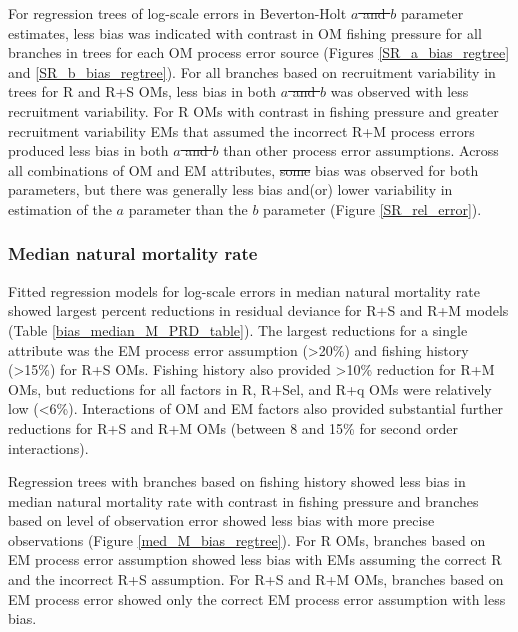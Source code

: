 \documentclass[
  12pt,
]{article}
\makeatletter
\providecommand{\DIFadd}[1]{{\protect\color{blue}\uwave{#1}}} %
\providecommand{\DIFdel}[1]{{\protect\color{red}\sout{#1}}} %
\providecommand{\DIFaddbegin}{} %
\providecommand{\DIFaddend}{} %
\providecommand{\DIFdelbegin}{} %
\providecommand{\DIFdelend}{} %
\providecommand{\DIFscaledelfig}{0.5}
\newlength{\DIFdelgraphicswidth} %
\newlength{\DIFdelgraphicsheight} %
\providecommand{\DIFaddincludegraphics}[2][]{{\color{blue}\fbox{\DIFOincludegraphics[#1]{#2}}}} %
\providecommand{\DIFdelincludegraphics}[2][]{%
\sbox{\DIFdelgraphicsbox}{\DIFOincludegraphics[#1]{#2}}%
\settoboxwidth{\DIFdelgraphicswidth}{\DIFdelgraphicsbox} %
\settoboxtotalheight{\DIFdelgraphicsheight}{\DIFdelgraphicsbox} %
\scalebox{\DIFscaledelfig}{%
\parbox[b]{\DIFdelgraphicswidth}{\usebox{\DIFdelgraphicsbox}\\[-\baselineskip] \rule{\DIFdelgraphicswidth}{0em}}\llap{\resizebox{\DIFdelgraphicswidth}{\DIFdelgraphicsheight}{%
\setlength{\unitlength}{\DIFdelgraphicswidth}%
\begin{picture}(1,1)%
\thicklines\linethickness{2pt} %
{\color[rgb]{1,0,0}\put(0,0){\framebox(1,1){}}}%
{\color[rgb]{1,0,0}\put(0,0){\line( 1,1){1}}}%
{\color[rgb]{1,0,0}\put(0,1){\line(1,-1){1}}}%
\end{picture}%
}\hspace*{3pt}}} %
} %
\DeclareRobustCommand{\DIFaddbegin}{\DIFOaddbegin \let\includegraphics\DIFaddincludegraphics} %
\DeclareRobustCommand{\DIFaddend}{\DIFOaddend \let\includegraphics\DIFOincludegraphics} %
\DeclareRobustCommand{\DIFdelbegin}{\DIFOdelbegin \let\includegraphics\DIFdelincludegraphics} %
\DeclareRobustCommand{\DIFdelend}{\DIFOaddend \let\includegraphics\DIFOincludegraphics} %
\let\sout@orig\sout %
\renewcommand{\sout}[1]{\ifmmode\text{\sout@orig{\ensuremath{#1}}}\else\sout@orig{#1}\fi} %
\makeatother
\begin{document}
For regression trees of log-scale errors in Beverton-Holt \DIFdelbegin \DIFdel{\(a\) and
\(b\) }\DIFdelend \DIFaddbegin \DIFadd{\(\alpha\) and
\(\beta\) }\DIFaddend parameter estimates, less bias was indicated with contrast in
OM fishing pressure for all branches in trees for each OM process error
source (Figures \ref{SR_a_bias_regtree} and \ref{SR_b_bias_regtree}).
For all branches based on recruitment variability in trees for R and R+S
OMs, less bias in both \DIFdelbegin \DIFdel{\(a\) and \(b\) }\DIFdelend \DIFaddbegin \DIFadd{\(\alpha\) and \(\beta\) }\DIFaddend was observed with less
recruitment variability. For R OMs with contrast in fishing pressure and
greater recruitment variability EMs that assumed the incorrect R+M
process errors produced less bias in both \DIFdelbegin \DIFdel{\(a\) and \(b\) }\DIFdelend \DIFaddbegin \DIFadd{\(\alpha\) and \(\beta\) }\DIFaddend than
other process error assumptions. Across all combinations of OM and EM
attributes, \DIFdelbegin \DIFdel{some }\DIFdelend bias was observed for both parameters, but there was
generally less bias and(or) lower variability in estimation of the
\DIFdelbegin \DIFdel{\(a\)
}\DIFdelend \DIFaddbegin \DIFadd{\(\alpha\) }\DIFaddend parameter than the \DIFdelbegin \DIFdel{\(b\) }\DIFdelend \DIFaddbegin \DIFadd{\(\beta\) }\DIFaddend parameter (Figure
\ref{SR_rel_error}).

\subsubsection*{Median natural mortality
rate}\label{median-natural-mortality-rate}

Fitted regression models for log-scale errors in median natural
mortality rate showed largest percent reductions in residual deviance
for R+S and R+M models (Table \ref{bias_median_M_PRD_table}). The
largest reductions for a single attribute was the EM process error
assumption (\textgreater20\%) and fishing history (\textgreater15\%) for
R+S OMs. Fishing history also provided \textgreater10\% reduction for
R+M OMs, but reductions for all factors in R, R+Sel, and R+q OMs were
relatively low (\textless6\%). Interactions of OM and EM factors also
provided substantial further reductions for R+S and R+M OMs (between 8
and 15\% for second order interactions).

Regression trees with branches based on fishing history showed less bias
in median natural mortality rate with contrast in fishing pressure and
branches based on level of observation error showed less bias with more
precise observations (Figure \ref{med_M_bias_regtree}). For R OMs,
branches based on EM process error assumption showed less bias with EMs
assuming the correct R and the incorrect R+S assumption. For R+S and R+M
OMs, branches based on EM process error showed only the correct EM
process error assumption with less bias.
\end{document}
